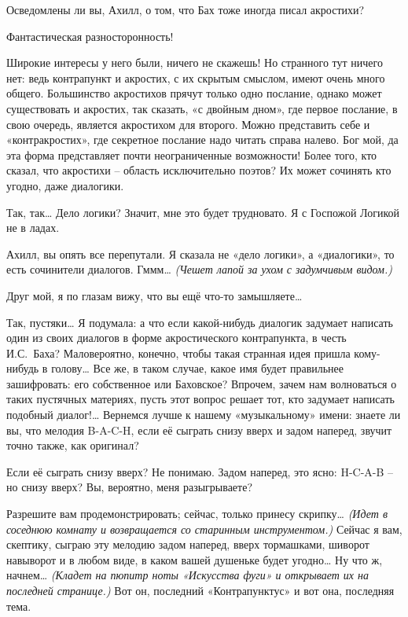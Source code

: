 \documentclass[../main.tex]{subfiles}
\begin{document}
\begin{Dialogue}
 Осведомлены ли вы, Ахилл, о том, что Бах тоже иногда писал акростихи?

 Фантастическая разносторонность!

 Широкие интересы у него были, ничего не скажешь! Но странного тут ничего нет: ведь контрапункт и акростих, с их скрытым смыслом, имеют очень много общего. Большинство акростихов прячут только одно послание, однако может существовать и акростих, так сказать, «с двойным дном», где первое послание, в свою очередь, является акростихом для второго. Можно представить себе и «контракростих», где секретное послание надо читать справа налево. Бог мой, да эта форма представляет почти неограниченные возможности! Более того, кто сказал, что акростихи \--- область исключительно поэтов? Их может сочинять кто угодно, даже диалогики.

 Так, так\ldots{} Дело логики? Значит, мне это будет трудновато. Я с Госпожой Логикой не в ладах.

 Ахилл, вы опять все перепутали. Я сказала не «дело логики», а «диалогики», то есть сочинители диалогов. Гммм\ldots{} \emph{(Чешет лапой за ухом с задумчивым видом.)}

 Друг мой, я по глазам вижу, что вы ещё что-то замышляете\ldots{}

 Так, пустяки\ldots{} Я подумала: а что если какой-нибудь диалогик задумает написать один из своих диалогов в форме акростического контрапункта, в честь И.С.~Баха? Маловероятно, конечно, чтобы такая странная идея пришла кому-нибудь в голову\ldots{} Все же, в таком случае, какое имя будет правильнее зашифровать: его собственное или Баховское? Впрочем, зачем нам волноваться о таких пустячных материях, пусть этот вопрос решает тот, кто задумает написать подобный диалог!\ldots{} Вернемся лучше к нашему «музыкальному» имени: знаете ли вы, что мелодия \mbox{B-A-C-H}, если её сыграть снизу вверх и задом наперед, звучит точно также, как оригинал?

 Если её сыграть снизу вверх? Не понимаю. Задом наперед, это ясно: \mbox{H-C-A-B} \--- но снизу вверх? Вы, вероятно, меня разыгрываете?

 Разрешите вам продемонстрировать; сейчас, только принесу скрипку\ldots{} \emph{(Идет в соседнюю комнату и возвращается со старинным инструментом.)} Сейчас я вам, скептику, сыграю эту мелодию задом наперед, вверх тормашками, шиворот навыворот и в любом виде, в каком вашей душеньке будет угодно\ldots{} Ну что ж, начнем\ldots{} \emph{(Кладет на пюпитр ноты «Искусства фуги» и открывает их на последней странице.)} Вот он, последний «Контрапунктус» и вот она, последняя тема.


\end{Dialogue}
\end{document}
